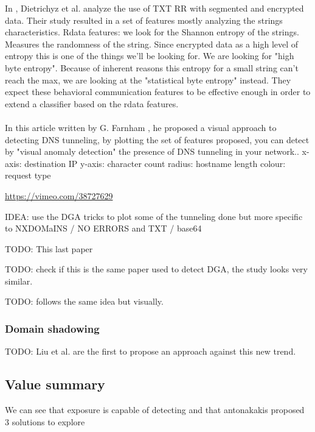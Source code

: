 In \cite{tunn1}, Dietrichyz et al. analyze the use of TXT RR with segmented and encrypted data. Their study resulted in a set of features mostly analyzing the strings characteristics. Rdata features: we look for the Shannon entropy of the strings. Measures the randomness of the string. Since encrypted data as a high level of entropy this is one of the things we'll be looking for. We are looking for "high byte entropy". Because of inherent reasons this entropy for a small string can't reach the max, we are looking at the "statistical byte entropy" instead. They expect these behavioral communication features to be effective enough in order to extend a classifier based on the rdata features.\\
\\
In this article written by G. Farnham \cite{tunn}, he proposed a visual approach to detecting DNS tunneling, by plotting the set of features proposed, you can detect by "visual anomaly detection" the presence of DNS tunneling in your network.. 
x-axis: destination IP
y-axis: character count
radius: hostname length
colour: request type

\url{https://vimeo.com/38727629}

IDEA: use the DGA tricks to plot some of the tunneling done
but more specific to NXDOMaINS / NO ERRORS and TXT / base64

TODO: This last paper \cite{dns-tun}

\cite{tunn2}

TODO: check if this is the same paper used to detect DGA, the study looks very similar. %

\cite{tunn3} 

\cite{tunn4}

TODO: follows the same idea but visually.

\subsubsection{Domain shadowing}
TODO: Liu et al. \cite{shadowing} are the first to propose an approach against this new trend. 


\subsection{Value summary}
We can see that exposure is capable of detecting and that antonakakis proposed 3 solutions to explore 

